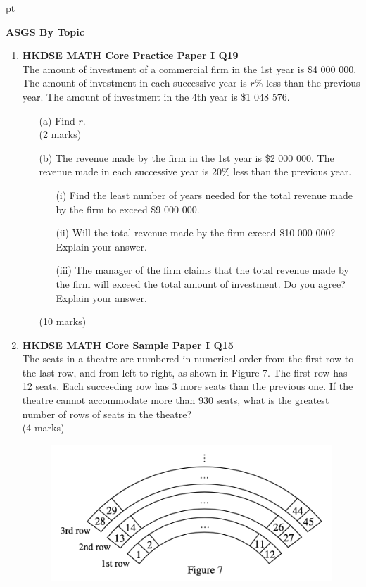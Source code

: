\documentclass[12pt]{article}
\begin{document}
 pt
\begin{center}
	{\large \bf ASGS By Topic}
\end{center}
\vspace{0.05cm}

\begin{enumerate}
	\item \textbf{HKDSE MATH Core Practice Paper I Q19}\\
	The amount of investment of a commercial firm in the 1st year is \$4 000 000. The amount of investment in each successive year is $r \%$ less than the previous year. The amount of investment in the 4th year is \$1 048 576.
	\begin{enumerate}
		\item[(a)] Find $r$. \\(2 marks)
		\item[(b)] The revenue made by the firm in the 1st year is \$2 000 000. The revenue made in each successive year is 20\% less than the previous year.
		\begin{enumerate}
			\item[(i)] Find the least number of years needed for the total revenue made by the firm to exceed \$9 000 000.
			\item[(ii)] Will the total revenue made by the firm exceed \$10 000 000? Explain your answer.
			\item[(iii)] The manager of the firm claims that the total revenue made by the firm will exceed the total amount of investment. Do you agree? Explain your answer.	
		\end{enumerate}
		(10 marks)
	\end{enumerate}

	\item \textbf{HKDSE MATH Core Sample Paper I Q15}\\
	The seats in a theatre are numbered in numerical order from the first row to the last row, and from left to right, as shown in Figure 7. The first row has 12 seats. Each succeeding row has 3 more seats than the previous one. If the theatre cannot accommodate more than 930 seats, what is the greatest number of rows of seats in the theatre? \\(4 marks)
	\begin{figure}[H]
		\centering
		\includegraphics[width = .5\linewidth]{SPFigure1.7}
	\end{figure}






\end{enumerate}
\end{document}
